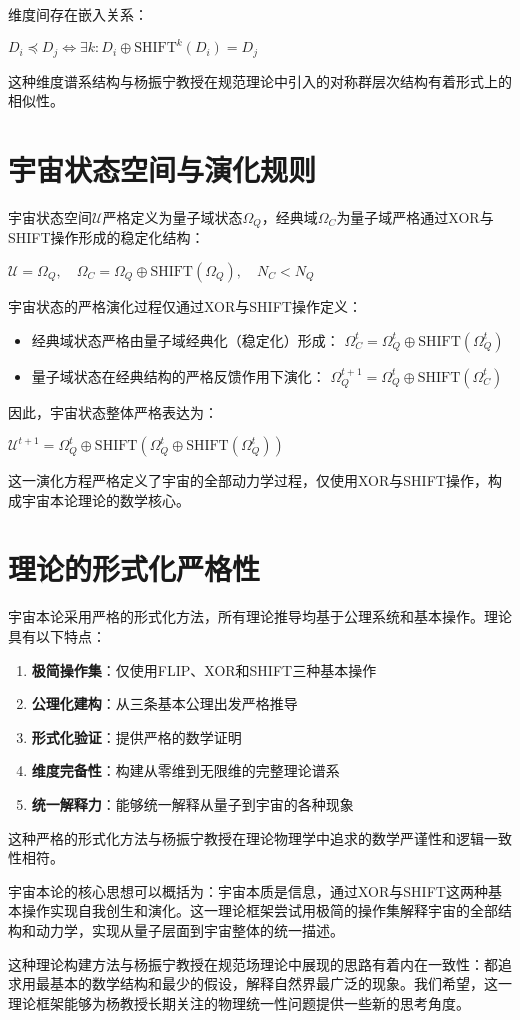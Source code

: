 维度间存在嵌入关系：

$D_i \preceq D_j \iff \exists k: D_i \oplus \text{SHIFT}^k(D_i) = D_j$

这种维度谱系结构与杨振宁教授在规范理论中引入的对称群层次结构有着形式上的相似性。

\section{宇宙状态空间与演化规则}

宇宙状态空间$\mathcal{U}$严格定义为量子域状态$\Omega_Q$，经典域$\Omega_C$为量子域严格通过XOR与SHIFT操作形成的稳定化结构：

$\mathcal{U} = \Omega_Q, \quad \Omega_C = \Omega_Q \oplus \text{SHIFT}(\Omega_Q), \quad N_C < N_Q$

宇宙状态的严格演化过程仅通过XOR与SHIFT操作定义：

\begin{itemize}
  \item 经典域状态严格由量子域经典化（稳定化）形成：
  $\Omega_C^{t} = \Omega_Q^{t} \oplus \text{SHIFT}(\Omega_Q^{t})$

  \item 量子域状态在经典结构的严格反馈作用下演化：
  $\Omega_Q^{t+1} = \Omega_Q^{t} \oplus \text{SHIFT}(\Omega_C^{t})$
\end{itemize}

因此，宇宙状态整体严格表达为：

$\mathcal{U}^{t+1} = \Omega_Q^{t}\oplus\text{SHIFT}(\Omega_Q^{t}\oplus\text{SHIFT}(\Omega_Q^{t}))$

这一演化方程严格定义了宇宙的全部动力学过程，仅使用XOR与SHIFT操作，构成宇宙本论理论的数学核心。

\section{理论的形式化严格性}

宇宙本论采用严格的形式化方法，所有理论推导均基于公理系统和基本操作。理论具有以下特点：

\begin{enumerate}
  \item \textbf{极简操作集}：仅使用FLIP、XOR和SHIFT三种基本操作
  \item \textbf{公理化建构}：从三条基本公理出发严格推导
  \item \textbf{形式化验证}：提供严格的数学证明
  \item \textbf{维度完备性}：构建从零维到无限维的完整理论谱系
  \item \textbf{统一解释力}：能够统一解释从量子到宇宙的各种现象
\end{enumerate}

这种严格的形式化方法与杨振宁教授在理论物理学中追求的数学严谨性和逻辑一致性相符。

宇宙本论的核心思想可以概括为：宇宙本质是信息，通过XOR与SHIFT这两种基本操作实现自我创生和演化。这一理论框架尝试用极简的操作集解释宇宙的全部结构和动力学，实现从量子层面到宇宙整体的统一描述。

这种理论构建方法与杨振宁教授在规范场理论中展现的思路有着内在一致性：都追求用最基本的数学结构和最少的假设，解释自然界最广泛的现象。我们希望，这一理论框架能够为杨教授长期关注的物理统一性问题提供一些新的思考角度。 